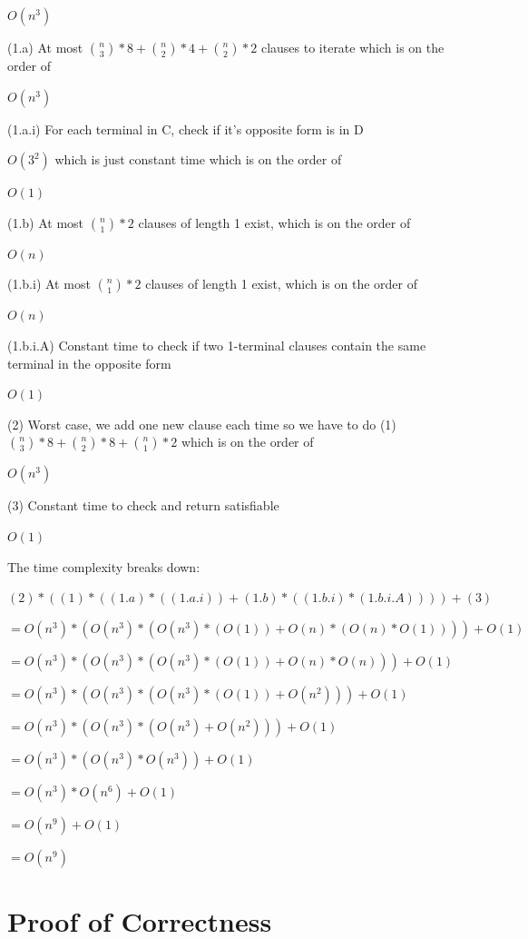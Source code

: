 \documentclass[manuscript]{acmart}
\begin{document}
    $O(n^3)$

    (1.a) At most ${n \choose 3}*8 + {n \choose 2}*4 + {n \choose 2}*2$ clauses to iterate which is on the order of

    $O(n^3)$

    (1.a.i) For each terminal in C, check if it's opposite form is in D

    $O(3^2)$ which is just constant time which is on the order of 

    $O(1)$

    (1.b) At most ${n \choose 1} * 2$ clauses of length 1 exist, which is on the order of

    $O(n)$

    (1.b.i) At most ${n \choose 1} * 2$ clauses of length 1 exist, which is on the order of

    $O(n)$

    (1.b.i.A) Constant time to check if two 1-terminal clauses contain the same terminal in the opposite form

    $O(1)$

    (2) Worst case, we add one new clause each time so we have to do (1) ${n \choose 3} * 8 + {n \choose 2} * 8 + {n \choose 1} * 2$ which is on the order of

    $O(n^3)$

    (3) Constant time to check and return satisfiable

    $O(1)$

    The time complexity breaks down:

    $(2) * ((1) * ((1.a) * ((1.a.i)) + (1.b) * ((1.b.i) * (1.b.i.A)))) + (3)$

    $= O(n^3) * (O(n^3) * (O(n^3) * (O(1)) + O(n) * (O(n) * O(1)))) + O(1)$

    $= O(n^3) * (O(n^3) * (O(n^3) * (O(1)) + O(n) * O(n))) + O(1)$

    $= O(n^3) * (O(n^3) * (O(n^3) * (O(1)) + O(n^2))) + O(1)$

    $= O(n^3) * (O(n^3) * (O(n^3) + O(n^2))) + O(1)$

    $= O(n^3) * (O(n^3) * O(n^3)) + O(1)$

    $= O(n^3) * O(n^6) + O(1)$

    $= O(n^9) + O(1)$

    $= O(n^9)$

    \section{Proof of Correctness}
\end{document}
